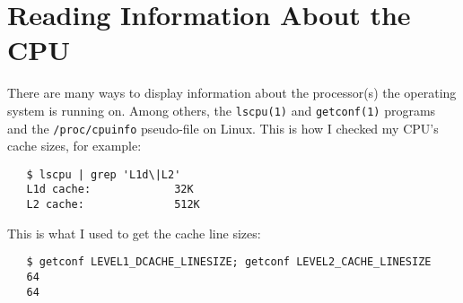 \section{Reading Information About the CPU}
\label{app:cpuinfo}
There are many ways to display information about the processor(s) the operating system is
running on.  Among others, the \texttt{lscpu(1)} and
\texttt{getconf(1)} programs and the \texttt{/proc/cpuinfo}
pseudo-file on Linux.  This is how I checked my CPU's cache sizes, for example:
\begin{verbatim}
   $ lscpu | grep 'L1d\|L2'
   L1d cache:             32K
   L2 cache:              512K
\end{verbatim}
This is what I used to get the cache line sizes:
\begin{verbatim}
   $ getconf LEVEL1_DCACHE_LINESIZE; getconf LEVEL2_CACHE_LINESIZE
   64
   64
\end{verbatim}

